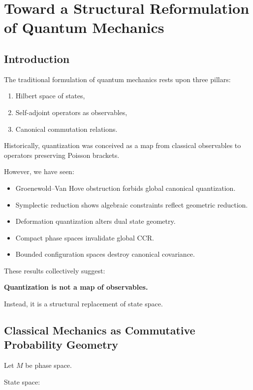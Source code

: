 \documentclass[11pt]{book}
\begin{document}
\chapter{Toward a Structural Reformulation of Quantum Mechanics}

\section{Introduction}

The traditional formulation of quantum mechanics rests upon three pillars:

\begin{enumerate}
\item Hilbert space of states,
\item Self-adjoint operators as observables,
\item Canonical commutation relations.
\end{enumerate}

Historically, quantization was conceived as a map from classical observables to operators preserving Poisson brackets.

However, we have seen:

\begin{itemize}
\item Groenewold--Van Hove obstruction forbids global canonical quantization.
\item Symplectic reduction shows algebraic constraints reflect geometric reduction.
\item Deformation quantization alters dual state geometry.
\item Compact phase spaces invalidate global CCR.
\item Bounded configuration spaces destroy canonical covariance.
\end{itemize}

These results collectively suggest:

\medskip
\noindent
\textbf{Quantization is not a map of observables.}

Instead, it is a structural replacement of state space.

\section{Classical Mechanics as Commutative Probability Geometry}

Let $M$ be phase space.

State space:
\end{document}
